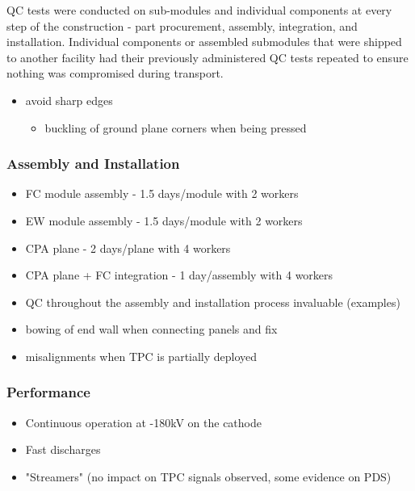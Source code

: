 QC tests were conducted on sub-modules and individual components at every step of the construction - part procurement, assembly, integration, and installation.
Individual components or assembled submodules that were shipped to another facility had their previously administered QC tests repeated to ensure nothing was compromised during transport. 
\begin{itemize}
\item avoid sharp edges
\begin{itemize}
\item buckling of ground plane corners when being pressed
\end{itemize}
\end{itemize}


\subsubsection{Assembly and Installation}
\label{sec:fdsp-hv-protodune-lessons-assy}
\begin{itemize}
\item FC module assembly - 1.5 days/module with 2 workers
\item EW module assembly - 1.5 days/module with 2 workers
\item CPA plane - 2 days/plane with 4 workers
\item CPA plane + FC integration - 1 day/assembly with 4 workers
\item QC throughout the assembly and installation process invaluable (examples)
\item bowing of end wall when connecting panels and fix
\item misalignments when TPC is partially deployed
\end{itemize}

\subsubsection{Performance}
\label{sec:fdsp-hv-protodune-lessons-perf}
\begin{itemize}
\item Continuous operation at -180kV on the cathode
\item Fast discharges
\item "Streamers" (no impact on TPC signals observed, some evidence on PDS)
\end{itemize}

